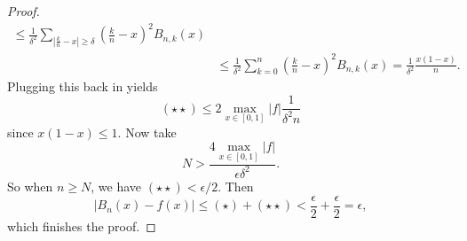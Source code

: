 \begin{proof}
\begin{align*}
    \le \frac{1}{\delta^2} \sum_{\left|\frac{k}{n} - x\right| \ge \delta} \left(\frac{k}{n} - x\right)^2 B_{n, k}(x) \\
                                                               &\le \frac{1}{\delta^2} \sum_{k = 0}^n \left(\frac{k}{n} - x\right)^2 B_{n, k}(x)
    = \frac{1}{\delta^2} \frac{x(1 - x)}{n}.
  \end{align*}
  Plugging this back in yields
  \[
    (\star \star) \le 2 \max_{x \in [0, 1]} |f| \frac{1}{\delta^2n}
  \]
  since $x(1 - x) \le 1$. Now
  take
  \[N > \frac{4\max_{x \in [0, 1]}|f|}{\epsilon \delta^2}.\]
  So when $n \ge N$, we have $(\star \star) < \epsilon / 2$.
  Then 
  \[|B_n(x) - f(x)| \le (\star) + (\star \star) < \frac{\epsilon}{2} + \frac{\epsilon}{2} = \epsilon,\]
  which finishes the proof.
\end{proof}
